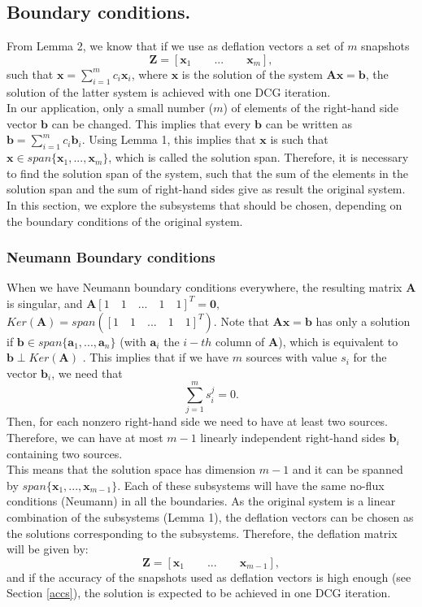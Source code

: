 \documentclass[review]{elsarticle}
\begin{document}
\subsection{Boundary conditions.}
From Lemma 2, we know that if we use as deflation vectors a set of $m$ snapshots $$\mathbf{Z}=[\mathbf{x}_1\qquad ...\qquad \mathbf{x}_m],$$ such that $\mathbf{x}=\sum_{i=1}^m {c}_i\mathbf{x}_i$, where $\mathbf{x}$ is the solution of the system $\mathbf{A}\mathbf{x}=\mathbf{b}$, the solution of the latter system is achieved with one DCG iteration. \\
In our application, only a small number ($m$) of elements of the right-hand side vector $\mathbf{b}$
can be changed. This implies that every $\mathbf{b}$ can be written as $\mathbf{b}=\sum_{i=1}^m {c}_i\mathbf{b}_i.$ Using Lemma 1, this implies that $\mathbf{x}$ is such that 
$\mathbf{x}\in span\{ \mathbf{x}_1, ...,  \mathbf{x}_m\}$, which is called the solution span.
Therefore, it is necessary to find the solution span of the system, such that the sum of the elements in the solution span and the sum of right-hand sides give as result the original system. In this section, we explore the subsystems that should be chosen, depending on the boundary conditions of the original system. 
\subsubsection*{{Neumann Boundary conditions}}
When we have Neumann boundary conditions everywhere, the resulting matrix $\mathbf{A}$ is singular, and
$\mathbf{A}[1\quad 1\quad ...\quad 1\quad 1]^T=\mathbf{0},$ $Ker(\mathbf{A})=span([1\quad 1\quad ...\quad 1\quad 1]^T)$. 
Note that $\mathbf{A}\mathbf{x}=\mathbf{b}$ has only a solution if $\mathbf{b}\in span\{\mathbf{a}_1,...,\mathbf{a}_n\}$ (with $\mathbf{a}_i$ the $i-th$ column of $\mathbf{A}$), which is equivalent to $\mathbf{b}\perp Ker(\mathbf{A}) $ \cite{Strang09}.
This implies that if we have $m$ sources with value ${s}_i$ for the vector $\mathbf{b}_i$, we need that 
$$\sum_{j=1}^ m {s}^{j}_i=0.$$
Then, for each nonzero  right-hand side we need to have at least two sources. Therefore, we can have at most $m-1$ linearly independent right-hand sides $\mathbf{b}_{i}$ containing two sources.\\
This means that the solution space has dimension $m-1$ and it can be spanned by $ span\{\mathbf{x}_1,...,\mathbf{x}_{m-1}\}$.
Each of these subsystems will have the same no-flux conditions (Neumann) in all the boundaries.
As the original system is a linear combination of the subsystems (Lemma 1), the deflation vectors can be chosen as the solutions corresponding to the subsystems. Therefore, the deflation matrix will be given by:
$$\mathbf{Z}=[\mathbf{x}_1\qquad ...\qquad \mathbf{x}_{m-1}],$$
and if the accuracy of the snapshots used as deflation vectors is high enough (see Section \ref{accs}), the solution is expected to be achieved in one DCG iteration. 
\end{document}
